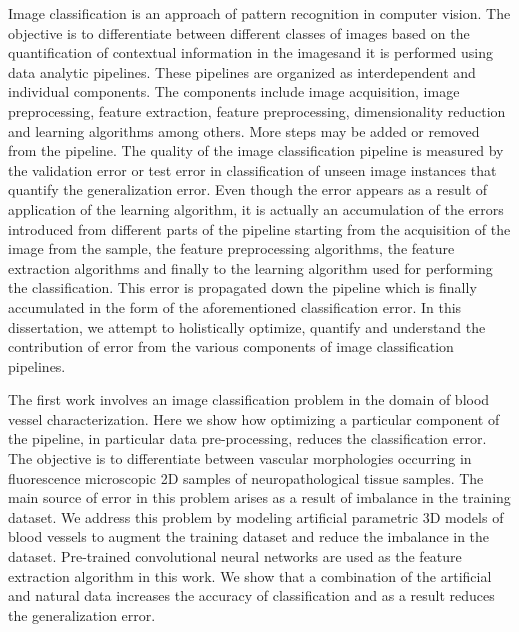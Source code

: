 
Image classification is an approach of pattern recognition in computer vision. The objective is to differentiate between different classes of images based on the quantification of contextual information in the imagesand it is performed using data analytic pipelines. These pipelines are organized as interdependent and individual components. The components include image acquisition, image preprocessing, feature extraction, feature preprocessing, dimensionality reduction and learning algorithms among others. More steps may be added or removed from the pipeline. The quality of the image classification pipeline is measured by the validation error or test error in classification of unseen image instances that quantify the generalization error. Even though the error appears as a result of application of the learning algorithm, it is actually an accumulation of the errors introduced from different parts of the pipeline starting from the acquisition of the image from the sample, the feature preprocessing algorithms, the feature extraction algorithms and finally to the learning algorithm used for performing the  classification. This error is propagated down the pipeline which is finally accumulated in the form of the aforementioned classification error. In this dissertation, we attempt to holistically optimize, quantify and understand the contribution of error from the various components of image classification pipelines.   


The first work involves an image classification problem in the domain of blood vessel characterization. Here we show how optimizing a particular component of the pipeline, in particular data pre-processing, reduces the classification error. The objective is to differentiate between vascular morphologies occurring in fluorescence microscopic 2D samples of neuropathological tissue samples. The main source of error in this problem arises as a result of imbalance in the training dataset. We address this problem by modeling artificial parametric 3D models of blood vessels to augment the training dataset and reduce the imbalance in the dataset. Pre-trained convolutional neural networks are used as the feature extraction algorithm in this work. We show that a combination of the artificial and natural data increases the accuracy of classification and as a result reduces the generalization error.

